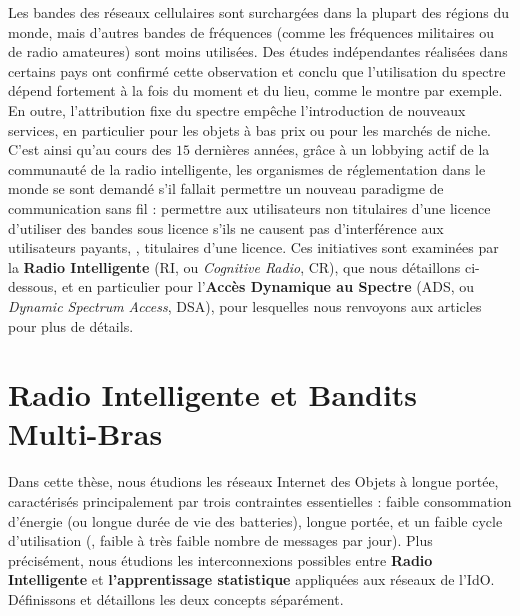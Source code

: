 \begin{resume_fr}
Les bandes des réseaux cellulaires sont surchargées dans la plupart des régions du monde, mais d'autres bandes de fréquences (comme les fréquences militaires ou de radio amateures) sont moins utilisées.
Des études indépendantes réalisées dans certains pays ont confirmé cette observation et conclu que l'utilisation du spectre dépend fortement à la fois du moment et du lieu, comme le montre \cite{Lopez2009spectral} par exemple.
En outre, l'attribution fixe du spectre empêche
l'introduction de nouveaux services, en particulier pour les objets à bas prix ou pour les marchés de niche.
%
C'est ainsi qu'au cours des $15$ dernières années, grâce à un lobbying actif de la communauté de la radio intelligente,
les organismes de réglementation dans le monde se sont demandé s'il fallait permettre un nouveau paradigme de communication sans fil :
permettre aux utilisateurs non titulaires d'une licence d'utiliser des bandes sous licence s'ils ne causent pas d'interférence aux utilisateurs payants, \ie, titulaires d'une licence.
Ces initiatives sont examinées par la \textbf{Radio Intelligente} (RI, ou \emph{Cognitive Radio}, CR),
que nous détaillons ci-dessous, et en particulier pour l'\textbf{Accès Dynamique au Spectre} (ADS, ou \emph{Dynamic Spectrum Access}, DSA),
pour lesquelles nous renvoyons aux articles \cite{akyildiz2006next,garhwal2012survey} pour plus de détails.



\section*{Radio Intelligente et Bandits Multi-Bras}

Dans cette thèse, nous étudions les réseaux Internet des Objets à longue portée, caractérisés principalement par trois contraintes essentielles :
faible consommation d'énergie (ou longue durée de vie des batteries),
longue portée,
et un faible cycle d'utilisation (\ie, faible à très faible nombre de messages par jour).
%
Plus précisément, nous étudions les interconnexions possibles entre \textbf{Radio Intelligente} et \textbf{l'apprentissage statistique} appliquées aux réseaux de l'IdO.
Définissons et détaillons les deux concepts séparément.



\end{resume_fr}
